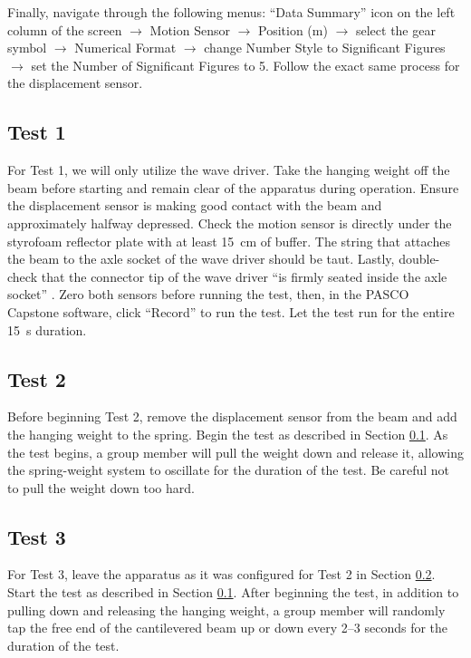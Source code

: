 \documentclass[12 pt]{report}
\begin{document}
Finally, navigate through the following menus: ``Data Summary'' icon on the left column of the screen $\rightarrow$ Motion Sensor $\rightarrow$ Position (m) $\rightarrow$ select the gear symbol $\rightarrow$ Numerical Format $\rightarrow$ change Number Style to Significant Figures $\rightarrow$ set the Number of Significant Figures to \num{5}. Follow the exact same process for the displacement sensor.

\subsection{Test 1} \label{procedures-test_1}
For Test 1, we will only utilize the wave driver. Take the hanging weight off the beam before starting and remain clear of the apparatus during operation. Ensure the displacement sensor is making good contact with the beam and approximately halfway depressed. Check the motion sensor is directly under the styrofoam reflector plate with at least \qty{15}{cm} of buffer. The string that attaches the beam to the axle socket of the wave driver should be taut. Lastly, double-check that the connector tip of the wave driver ``is firmly seated inside the axle socket'' \cite{lab_procedures}. Zero both sensors before running the test, then, in the PASCO Capstone software, click ``Record'' to run the test. Let the test run for the entire \qty{15}{s} duration. 

\subsection{Test 2} \label{procedures-test_2}
Before beginning Test 2, remove the displacement sensor from the beam and add the hanging weight to the spring. Begin the test as described in Section \ref{procedures-test_1}. As the test begins, a group member will pull the weight down and release it, allowing the spring-weight system to oscillate for the duration of the test. Be careful not to pull the weight down too hard.

\subsection{Test 3} \label{procedures-test_3}
For Test 3, leave the apparatus as it was configured for Test 2 in Section \ref{procedures-test_2}. Start the test as described in Section \ref{procedures-test_1}. After beginning the test, in addition to pulling down and releasing the hanging weight, a group member will randomly tap the free end of the cantilevered beam up or down every \numrange{2}{3} seconds for the duration of the test.
\end{document}

